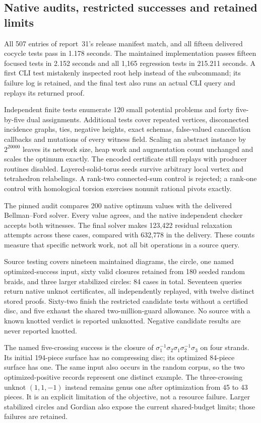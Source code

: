 \subsection{Native audits, restricted successes and retained limits}

All 507 entries of report~31's release manifest match, and all fifteen
delivered cocycle tests pass in 1.178 seconds. The maintained implementation
passes fifteen focused tests in 2.152 seconds and all 1,165 regression tests
in 215.211 seconds. A first CLI test mistakenly inspected root help instead
of the  subcommand; its failure log is retained, and the
final test also runs an actual CLI query and replays its returned proof.

Independent finite tests enumerate 120 small potential problems and forty
five-by-five dual assignments. Additional tests cover repeated vertices,
disconnected incidence graphs, ties, negative heights, exact schemas,
false-valued cancellation callbacks and mutations of every witness field.
Scaling an abstract instance by $2^{20000}$ leaves its network size, heap
work and augmentation count unchanged and scales the optimum exactly.
The encoded certificate still replays with producer routines disabled.
Layered-solid-torus seeds survive arbitrary local vertex and tetrahedron
relabelings. A rank-two connected-sum control is rejected; a rank-one control
with homological torsion exercises nonunit rational pivots exactly.

The pinned audit compares 200 native optimum values with the delivered
Bellman--Ford solver. Every value agrees, and the native independent checker
accepts both witnesses. The final solver makes 123,422 residual relaxation
attempts across these cases, compared with 632,778 in the delivery. These
counts measure that specific network work, not all bit operations in a
source query.

Source testing covers nineteen maintained diagrams, the circle, one named
optimized-success input, sixty valid closures retained from 180 seeded
random braids, and three larger stabilized circles: 84 cases in total.
Seventeen queries return native unknot certificates, all independently
replayed, with twelve distinct stored proofs. Sixty-two finish the restricted
candidate tests without a certified disc, and five exhaust the shared
two-million-guard allowance. No source with a known knotted verdict is
reported unknotted. Negative candidate results are never reported knotted.

The named five-crossing success is the closure of
$\sigma_1^{-1}\sigma_2\sigma_1\sigma_2^{-1}\sigma_3$ on four strands.
Its initial 194-piece surface has no compressing disc; its optimized
84-piece surface has one. The same input also occurs in the random corpus,
so the two optimized-positive records represent one distinct example.
The three-crossing unknot $(1,1,-1)$ instead remains genus one after
optimization from 45 to 43 pieces. It is an explicit limitation of the
objective, not a resource failure. Larger stabilized circles and Gordian
also expose the current shared-budget limits; those failures are retained.

